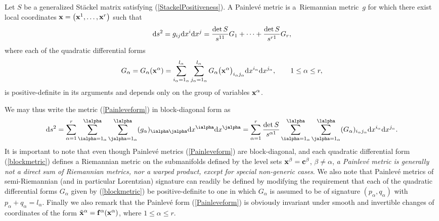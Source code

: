 \begin{Definition} \label{Painleve}
Let $S$ be a generalized St\"ackel matrix satisfying (\ref{StackelPositiveness}). A Painlev\'e metric is a~Riemannian metric~$g$ for which there exist local coordinates ${\bf x}=\big({\bf x}^{1},\dots,{\bf x}^{r}\big)$ such that
\begin{gather}\label{Painleveform}
{\rm d}s^{2}=g_{ij}{\rm d}x^{i}{\rm d}x^{j}=\frac{\det S}{s^{11}} G_1 +\cdots+\frac{\det S}{s^{r1}} G_r,
\end{gather}
where each of the quadratic differential forms
\begin{gather}\label{blockmetric}
G_{\alpha}=G_{\alpha}({{\bf x}^{\alpha}})=\sum_{i_{\alpha}=1_{\alpha}}^{l_{\alpha}}\sum_{j_{\alpha}=1_{\alpha}}^{l_{\alpha}}G_{\alpha}\big({{\bf x}^{\alpha}}\big)_{i_{\alpha}j_{\alpha}}{\rm d}x^{i_{\alpha}}{\rm d}x^{j_{\alpha}},\qquad 1\leq \alpha \leq r,
\end{gather}
is positive-definite in its arguments and depends only on the group of variables ${\bf x}^{\alpha}$.
\end{Definition}
We may thus write the metric (\ref{Painleveform}) in block-diagonal form as
\[
{\rm d}s^{2}=\sum_{\alpha =1}^{r}\sum_{\ialpha = 1_{\alpha}}^{\lalpha}\sum_{\jalpha = 1_{\alpha}}^{\lalpha}(g_{\alpha})_{\ialpha \jalpha}{\rm d}x^{\ialpha}{\rm d}x^{\jalpha}=\sum_{\alpha =1}^{r} \frac{\det S}{s^{\alpha 1}} \sum_{\ialpha = 1_{\alpha}}^{\lalpha}\sum_{\jalpha = 1_{\alpha}}^{\lalpha}(G_{\alpha})_{i_{\alpha}j_{\alpha}}{\rm d}x^{i_{\alpha}}{\rm d}x^{j_{\alpha}}.
\]
It is important to note that even though Painlev\'e metrics (\ref{Painleveform}) are block-diagonal, and each quadratic differential form (\ref{blockmetric}) defines a Riemannian metric on the submanifolds defined by the level sets ${\bf x}^{\beta}={\bf{c}}^{\beta}$, $\beta\neq \alpha$, {\emph {a Painlev\'e metric is generally not a direct sum of Riemannian metrics, nor a warped product, except for special non-generic cases}}. We also note that Painlev\'e metrics of semi-Riemannian (and in particular Lorentzian) signature can readily be defined by modifying the requirement that each of the quadratic differential forms $G_{\alpha}$ given by (\ref{blockmetric}) be positive-definite to one in which $G_{{\alpha}}$ is assumed to be of signature $(p_{\alpha},q_{\alpha})$ with $p_{\alpha}+q_{\alpha}=l_{\alpha}$. Finally we also remark that the Painlev\'e form (\ref{Painleveform}) is obviously invariant under smooth and invertible changes of coordinates of the form ${\tilde{\bf x}}^{\alpha}={\bf{f}}^{\alpha}({\bf x}^{\alpha})$, where $1\leq \alpha \leq r$.

